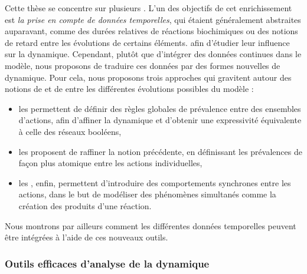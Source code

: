 Cette thèse se concentre sur plusieurs .
L'un des objectifs de cet enrichissement est \emph{la prise en compte de données temporelles},
qui étaient généralement abstraites auparavant,
comme des durées relatives de réactions biochimiques
ou des notions de retard entre les évolutions de certains éléments.
afin d'étudier leur influence sur la dynamique.
Cependant, plutôt que d'intégrer des données continues dans le modèle,
nous proposons de traduire ces données par des formes nouvelles de dynamique.
Pour cela, nous proposons trois approches qui gravitent autour des notions
de  et de  entre les différentes
évolutions possibles du modèle :
\begin{itemize}
  \item les  permettent de définir des règles globales de prévalence
    entre des ensembles d'actions, afin d'affiner la dynamique et d'obtenir une expressivité
    équivalente à celle des réseaux booléens,
  \item les  proposent de raffiner la notion précédente,
    en définissant les prévalences de façon plus atomique entre les actions individuelles,
  \item les , enfin, permettent d'introduire des comportements
    synchrones entre les actions, dans le but de modéliser des phénomènes simultanés
    comme la création des produits d'une réaction.
\end{itemize}
Nous montrons par ailleurs comment les différentes données temporelles peuvent être
intégrées à l'aide de ces nouveaux outils.

\subsubsection*{Outils efficaces d'analyse de la dynamique}

